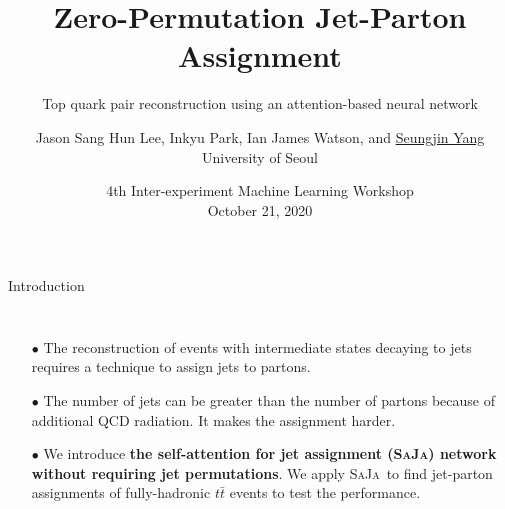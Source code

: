\documentclass[10pt]{beamer}
\title{Zero-Permutation Jet-Parton Assignment}
\subtitle{Top quark pair reconstruction using an attention-based neural network}
\author{
    Jason Sang Hun Lee,
    Inkyu Park,
    Ian James Watson,
    and \underline{Seungjin Yang} \\
    University of Seoul %
}
\date{
    4th Inter-experiment Machine Learning Workshop\\
    October 21, 2020
}
\newcommand{\saja}[0]{\textsc{SaJa}}
\begin{document}
\maketitle




\begin{frame}[fragile]{Introduction}
\begin{columns}
    \begin{itemize}
        \item[$\bullet$] The reconstruction of events with intermediate states decaying to jets requires a technique to assign jets to partons.
        \item[$\bullet$] The number of jets can be greater than the number of partons because of additional QCD radiation. It makes the assignment harder.
        \item[$\bullet$] We introduce \textbf{the self-attention for jet assignment (\saja ) network without requiring jet permutations}. We apply \saja\, to find jet-parton assignments of fully-hadronic $t\bar{t}$ events to test the performance.
    \end{itemize}


\end{columns}
\end{frame}
\end{document}
